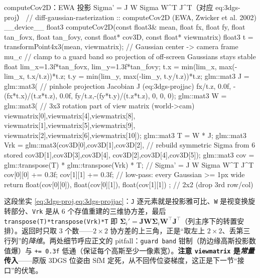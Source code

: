 \begin{codebox}[C++]{computeCov2D：EWA 投影 Sigma' = J W Sigma W\textasciicircum T J\textasciicircum T（对应 eq:3dgs-proj）}
// diff-gaussian-rasterization :: computeCov2D  (EWA, Zwicker et al. 2002)
__device__ float3 computeCov2D(const float3& mean, float fx, float fy,
        float tan_fovx, float tan_fovy, const float* cov3D, const float* viewmatrix) {
    float3 t = transformPoint4x3(mean, viewmatrix);    // Gaussian center -> camera frame  mu_c
    // clamp to a guard band so projection of off-screen Gaussians stays stable
    float lim_x=1.3f*tan_fovx, lim_y=1.3f*tan_fovy;
    t.x = min(lim_x, max(-lim_x, t.x/t.z))*t.z;  t.y = min(lim_y, max(-lim_y, t.y/t.z))*t.z;
    glm::mat3 J = glm::mat3(                            // pinhole projection Jacobian J (eq:3dgs-projjac)
        fx/t.z, 0.0f,  -(fx*t.x)/(t.z*t.z),
        0.0f,   fy/t.z,-(fy*t.y)/(t.z*t.z),
        0,      0,      0);
    glm::mat3 W = glm::mat3(                            // 3x3 rotation part of view matrix (world->cam)
        viewmatrix[0],viewmatrix[4],viewmatrix[8],
        viewmatrix[1],viewmatrix[5],viewmatrix[9],
        viewmatrix[2],viewmatrix[6],viewmatrix[10]);
    glm::mat3 T = W * J;
    glm::mat3 Vrk = glm::mat3(cov3D[0],cov3D[1],cov3D[2],   // rebuild symmetric Sigma from 6 stored
                              cov3D[1],cov3D[3],cov3D[4],
                              cov3D[2],cov3D[4],cov3D[5]);
    glm::mat3 cov = glm::transpose(T) * glm::transpose(Vrk) * T;  // Sigma' = J W Sigma W^T J^T
    cov[0][0] += 0.3f;  cov[1][1] += 0.3f;             // low-pass: every Gaussian >= 1px wide
    return { float(cov[0][0]), float(cov[0][1]), float(cov[1][1]) };  // 2x2 (drop 3rd row/col)
}
\end{codebox}

\noindent{}这段坐实 \cref{eq:3dgs-proj,eq:3dgs-projjac}：\texttt{J} 逐元素就是投影雅可比、\texttt{W} 是视变换旋转部分、\texttt{Vrk} 是从 $6$ 个存值重建的三维协方差，最后 \texttt{transpose(T)*transpose(Vrk)*T} 即 $\boldsymbol\Sigma_i'=\mathbf J\mathbf W\boldsymbol\Sigma_i\mathbf W^\top\mathbf J^\top$（列主序下的转置安排）。返回时只取 $3$ 个数——$2\times2$ 协方差的上三角，正是“取左上 $2\times2$、丢第三行列”的\emph{降维}。两处细节呼应正文的 pitfall：\texttt{guard band} 钳制（防边缘高斯投影数值爆）与 \texttt{+= 0.3f} 低通（保证每个高斯至少一像素宽）。\textbf{注意 \texttt{viewmatrix} 是\emph{常量}传入}——原版 3DGS 位姿由 SfM 定死，从不回传位姿梯度，这正是下一节“接口”的伏笔。

